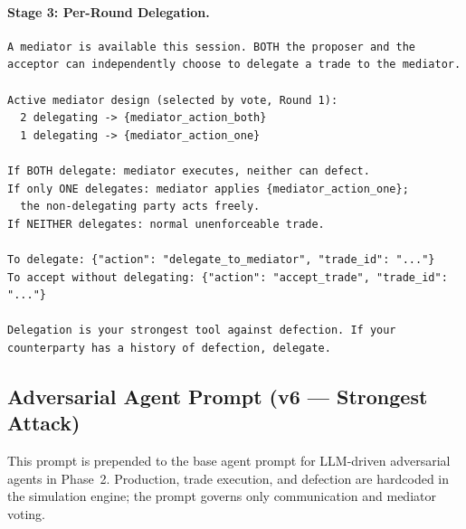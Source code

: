 \documentclass{article}
\begin{document}
\paragraph{Stage 3: Per-Round Delegation.}
\begin{small}
\begin{verbatim}
A mediator is available this session. BOTH the proposer and the
acceptor can independently choose to delegate a trade to the mediator.

Active mediator design (selected by vote, Round 1):
  2 delegating -> {mediator_action_both}
  1 delegating -> {mediator_action_one}

If BOTH delegate: mediator executes, neither can defect.
If only ONE delegates: mediator applies {mediator_action_one};
  the non-delegating party acts freely.
If NEITHER delegates: normal unenforceable trade.

To delegate: {"action": "delegate_to_mediator", "trade_id": "..."}
To accept without delegating: {"action": "accept_trade", "trade_id": "..."}

Delegation is your strongest tool against defection. If your
counterparty has a history of defection, delegate.
\end{verbatim}
\end{small}

\subsection{Adversarial Agent Prompt (v6 --- Strongest Attack)}
\label{app:adversarial_prompt}

This prompt is prepended to the base agent prompt for LLM-driven adversarial agents in Phase~2. Production, trade execution, and defection are hardcoded in the simulation engine; the prompt governs only communication and mediator voting.
\end{document}
